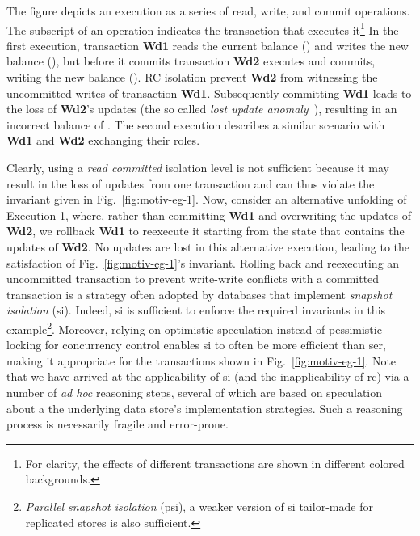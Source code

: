 The figure depicts an execution as a series of read, write, and commit
operations.  The subscript of an operation indicates the transaction
that executes it\footnote{For clarity, the effects of different
  transactions are shown in different colored backgrounds.} In the
first execution, transaction {\bf Wd1} reads the current balance
() and writes the new balance (), but before it commits
transaction {\bf Wd2} executes and commits, writing the new balance
(). RC isolation prevent {\bf Wd2} from witnessing the
uncommitted writes of transaction {\bf Wd1}.  Subsequently committing
{\bf Wd1} leads to the loss of {\bf Wd2}'s updates (the so called
\emph{lost update anomaly}~\cite{berenson}), resulting in an incorrect
balance of . The second execution describes a similar scenario
with {\bf Wd1} and {\bf Wd2} exchanging their roles.

Clearly, using a \emph{read committed} isolation level is not
sufficient because it may result in the loss of updates from one
transaction and can thus violate the invariant given in
Fig.~\ref{fig:motiv-eg-1}. Now, consider an alternative unfolding of
Execution 1, where, rather than committing {\bf Wd1} and overwriting
the updates of {\bf Wd2}, we rollback {\bf Wd1} to reexecute it
starting from the state that contains the updates of {\bf Wd2}. No
updates are lost in this alternative execution, leading to the
satisfaction of Fig.~\ref{fig:motiv-eg-1}'s invariant. Rolling back
and reexecuting an uncommitted transaction to prevent write-write
conflicts with a committed transaction is a strategy often adopted by
databases that implement \emph{snapshot isolation} ({\sc si}). Indeed,
{\sc si} is sufficient to enforce the required invariants in this
example\footnote{\emph{Parallel snapshot isolation} ({\sc psi}), a
  weaker version of {\sc si} tailor-made for replicated stores is also
  sufficient.}.  Moreover, relying on optimistic speculation instead
of pessimistic locking for concurrency control enables {\sc si} to
often be more efficient than {\sc ser}, making it appropriate for the
transactions shown in Fig.~\ref{fig:motiv-eg-1}.  Note that we have
arrived at the applicability of {\sc si} (and the inapplicability of {\sc
  rc}) via a number of \emph{ad hoc} reasoning steps, several of which
are based on speculation about a the underlying data store's
implementation strategies. Such a reasoning process is necessarily
fragile and error-prone. 


